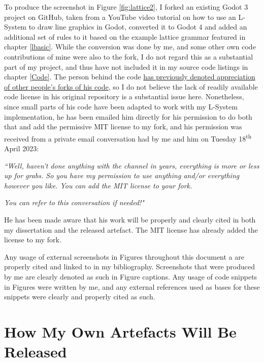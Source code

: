 To produce the screenshot in Figure \ref{fig:lattice2}, I forked an existing Godot 3 project on GitHub\cite{codatGD3LSystemGH}, taken from a YouTube video tutorial on how to use an L-System to draw line graphics in Godot\cite{codatGD3LSystemYT}, converted it to Godot 4 and added an additional set of rules to it based on the example lattice grammar featured in chapter \ref{lbasic}.\cite{codatGD4LSystemGH} While the conversion was done by me, and some other own code contributions of mine were also to the fork, I do not regard this as a substantial part of my project, and thus have not included it in my source code listings in chapter \ref{Code}. The person behind the code \hyperlink{https://www.youtube.com/watch?v=eY9XkJERiG0&lc=UgwXjzr7jheuC9hH18h4AaABAg}{has previously denoted appreciation of other people's forks of his code}, so I do not believe the lack of readily available code license in his original repository is a substantial issue here. Nonetheless, since small parts of his code have been adapted to work with my L-System implementation, he has been emailed him directly for his permission to do both that and add the permissive MIT license to my fork, and his permission was received from a private email conversation had by me and him on Tuesday 18\textsuperscript{th} April 2023:

\textit{``Well, haven't done anything with the channel in years, everything is more or less up for grabs. So you have my permission to use anything and/or everything however you like. You can add the MIT license to your fork.}

\textit{You can refer to this conversation if needed!"}

He has been made aware that his work will be properly and clearly cited in both my dissertation and the released artefact. The MIT license has already added the license to my fork.\cite{codatGD4LSystemGH}

Any usage of external screenshots in Figures throughout this document a are properly cited and linked to in my bibliography. Screenshots that were produced by me are clearly denoted as such in Figure captions. Any usage of code snippets in Figures were written by me, and any external references used as bases for these snippets were clearly and properly cited as such.

\section{How My Own Artefacts Will Be Released} \label{howrelease}

